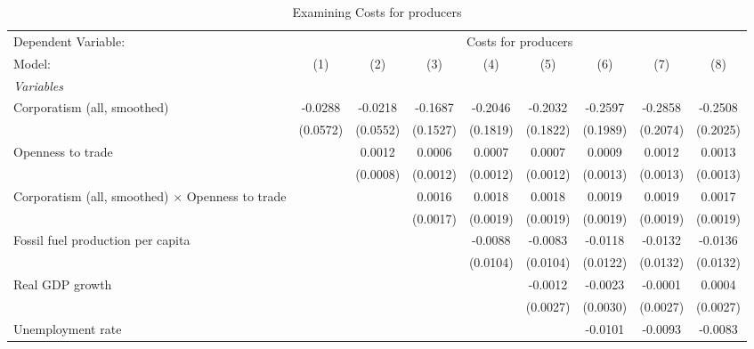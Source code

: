 
\begin{table}[htbp]
   \caption{Examining Costs for producers}
   \centering
   \begin{tabular}{lcccccccc}
      \tabularnewline \midrule \midrule
      Dependent Variable: & \multicolumn{8}{c}{Costs for producers}\\
      Model:                                                  & (1)      & (2)      & (3)      & (4)      & (5)      & (6)      & (7)      & (8)\\  
      \midrule
      \emph{Variables}\\
      Corporatism (all, smoothed)                             & -0.0288  & -0.0218  & -0.1687  & -0.2046  & -0.2032  & -0.2597  & -0.2858  & -0.2508\\   
                                                              & (0.0572) & (0.0552) & (0.1527) & (0.1819) & (0.1822) & (0.1989) & (0.2074) & (0.2025)\\   
      Openness to trade                                       &          & 0.0012   & 0.0006   & 0.0007   & 0.0007   & 0.0009   & 0.0012   & 0.0013\\   
                                                              &          & (0.0008) & (0.0012) & (0.0012) & (0.0012) & (0.0013) & (0.0013) & (0.0013)\\   
      Corporatism (all, smoothed) $\times$ Openness to trade  &          &          & 0.0016   & 0.0018   & 0.0018   & 0.0019   & 0.0019   & 0.0017\\   
                                                              &          &          & (0.0017) & (0.0019) & (0.0019) & (0.0019) & (0.0019) & (0.0019)\\   
      Fossil fuel production per capita                       &          &          &          & -0.0088  & -0.0083  & -0.0118  & -0.0132  & -0.0136\\   
                                                              &          &          &          & (0.0104) & (0.0104) & (0.0122) & (0.0132) & (0.0132)\\   
      Real GDP growth                                         &          &          &          &          & -0.0012  & -0.0023  & -0.0001  & 0.0004\\   
                                                              &          &          &          &          & (0.0027) & (0.0030) & (0.0027) & (0.0027)\\   
      Unemployment rate                                       &          &          &          &          &          & -0.0101  & -0.0093  & -0.0083\\   

\end{tabular}
\end{table}
